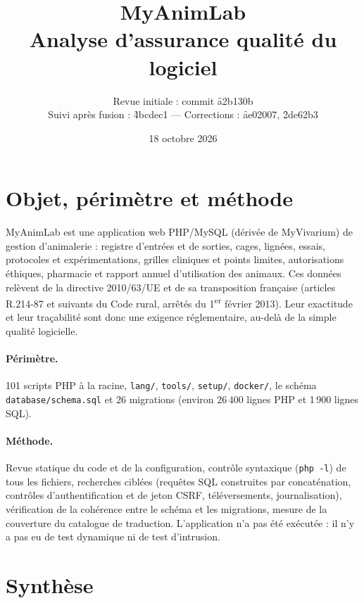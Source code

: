\documentclass[11pt,a4paper]{article}
\title{\textbf{MyAnimLab}\\[4pt]\large Analyse d'assurance qualité du logiciel}
\author{Revue initiale : commit \f{a2b130b}\\ Suivi après fusion : \f{4bcdec1} --- Corrections : \f{ae02007}, \f{2de62b3}}
\date{18 octobre 2026}
\newcommand{\f}[1]{\nolinkurl{#1}}
\begin{document}
\maketitle
\thispagestyle{fancy}

\section{Objet, périmètre et méthode}

MyAnimLab est une application web PHP/MySQL (dérivée de MyVivarium) de gestion
d'animalerie : registre d'entrées et de sorties, cages, lignées, essais,
protocoles et expérimentations, grilles cliniques et points limites,
autorisations éthiques, pharmacie et rapport annuel d'utilisation des animaux.
Ces données relèvent de la directive 2010/63/UE et de sa transposition française
(articles R.214-87 et suivants du Code rural, arrêtés du 1\textsuperscript{er}
février 2013). Leur exactitude et leur traçabilité sont donc une exigence
réglementaire, au-delà de la simple qualité logicielle.

\paragraph{Périmètre.} 101 scripts PHP à la racine, \f{lang/}, \f{tools/},
\f{setup/}, \f{docker/}, le schéma \f{database/schema.sql} et 26 migrations
(environ 26\,400 lignes PHP et 1\,900 lignes SQL).

\paragraph{Méthode.} Revue statique du code et de la configuration, contrôle
syntaxique (\texttt{php -l}) de tous les fichiers, recherches ciblées (requêtes SQL
construites par concaténation, contrôles d'authentification et de jeton CSRF,
téléversements, journalisation), vérification de la cohérence entre le schéma et
les migrations, mesure de la couverture du catalogue de traduction. L'application
n'a pas été exécutée : il n'y a pas eu de test dynamique ni de test d'intrusion.

\section{Synthèse}
\end{document}
